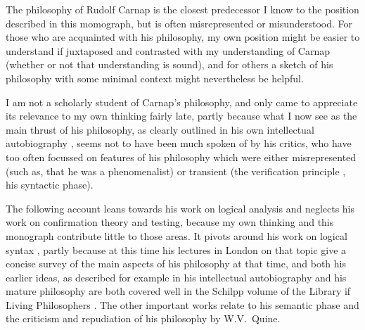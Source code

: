 The philosophy of Rudolf Carnap is the closest predecessor I know to the position described in this momograph, but is often misrepresented or misunderstood.
For those who are acquainted with his philosophy, my own position might be easier to understand if juxtaposed and contrasted with my understanding of Carnap (whether or not that understanding is sound), and for others a sketch of his philosophy with some minimal context might nevertheless be helpful.

I am not a scholarly student of Carnap's philosophy, and only came to appreciate its relevance to my own thinking fairly late, partly because what I now see as the main thrust of his philosophy, as clearly outlined in his own intellectual autobiography \cite{carnap1963}, seems not to have been much spoken of by his critics, who have too often focussed on features of his philosophy which were either misrepresented (such as, that he was a phenomenalist) or transient (the verification principle \cite{carnap1937}, his syntactic phase).

The following account leans towards his work on logical analysis and neglects his work on confirmation theory and testing, because my own thinking and this monograph contribute little to those areas.
It pivots around his work on logical syntax \cite{carnap1935}, partly because at this time his lectures in London on that topic \cite{carnap1937} give a concise survey of the main aspects of his philosophy at that time, and both his earlier ideas, as described for example in his intellectual autobiography \cite{carnap1963} and his mature philosophy are both covered well in the Schilpp volume of the Library if Living Philosophers \cite{carnap63a}.
The other important works \cite{carnap1956,carnap1950,carnap1990}  relate to his semantic phase and the criticism and repudiation of his philosophy by W.V.~Quine.
